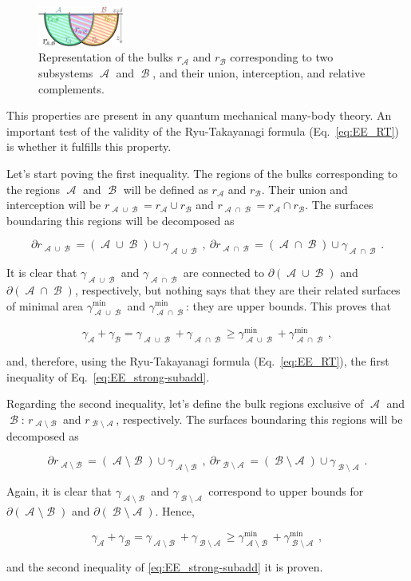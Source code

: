 \documentclass[twocolumn]{revtex4}
\providecommand{\eq}[2]{
    \begin{equation}
        #2
    \label{eq:#1}
    \end{equation}
}
\DeclareMathOperator{\calA}{\mathcal{A}}
\DeclareMathOperator{\calB}{\mathcal{B}}
\begin{document}
\begin{figure}
    \centering
    \includegraphics[width=0.25\textwidth]{../Imatges/SS_D.png}
\caption{Representation of the bulks $r_{\calA}$ and $r_{\calB}$ corresponding to two subsystems $\calA$ and $\calB$, and their union, interception, and relative complements.}
\label{fig:SS}
\end{figure}

This properties are present in any quantum mechanical many-body theory. An important test of the validity of the Ryu-Takayanagi formula (Eq.~\ref{eq:EE_RT}) is whether it fulfills this property.

Let's start poving the first inequality. The regions of the bulks corresponding to the regions $\calA$ and $\calB$ will be defined as $r_{\calA}$ and $r_{\calB}$. Their union and interception will be $r_{\calA \cup \calB} = r_{\calA} \cup r_{\calB}$ and $r_{\calA \cap \calB} = r_{\calA} \cap r_{\calB}$. The surfaces boundaring this regions will be decomposed as
\eq{SS_dr-1}{
    \partial r_{\calA \cup \calB} = (\calA \cup \calB) \cup \gamma_{\calA \cup \calB} \ , \ \partial r_{\calA \cap \calB } = (\calA \cap \calB) \cup \gamma_{\calA \cap \calB} \ .
}
It is clear that $\gamma_{\calA \cup \calB}$ and $\gamma_{\calA \cap \calB}$ are connected to $\partial (\calA \cup \calB)$ and $\partial (\calA \cap \calB)$, respectively, but nothing says that they are their related surfaces of minimal area $\gamma^{\text{min}}_{\calA \cup \calB}$ and $\gamma^{\text{min}}_{\calA \cap \calB}$: they are upper bounds. This proves that
\eq{SS_gamma-1}{
    \gamma_{\calA} + \gamma_{\calB} = \gamma_{\calA \cup \calB} + \gamma_{\calA \cap \calB} \ge \gamma^{\text{min}}_{\calA \cup \calB} + \gamma^{\text{min}}_{\calA \cap \calB} \ ,
}
and, therefore, using the Ryu-Takayanagi formula (Eq.~\ref{eq:EE_RT}), the first inequality of Eq.~\ref{eq:EE_strong-subadd}.

Regarding the second inequality, let's define the bulk regions exclusive of $\calA$ and $\calB$: $r_{\calA \setminus \calB}$ and $r_{\calB \setminus \calA}$, respectively. The surfaces boundaring this regions will be decomposed as
\eq{SS_dr-2}{
    \partial r_{\calA \setminus \calB} = (\calA \setminus \calB) \cup \gamma_{\calA \setminus \calB} \ , \ \partial r_{\calB \setminus \calA } = (\calB \setminus \calA) \cup \gamma_{\calB \setminus \calA} \ .
}
Again, it is clear that $\gamma_{\calA \setminus \calB}$ and $\gamma_{\calB \setminus \calA}$ correspond to upper bounds for $\partial (\calA \setminus \calB)$ and $\partial (\calB \setminus \calA)$. Hence,
\eq{SS_gamma-2}{
    \gamma_{\calA} + \gamma_{\calB} = \gamma_{\calA \setminus \calB} + \gamma_{\calB \setminus \calA} \ge \gamma^{\text{min}}_{\calA \setminus \calB} + \gamma^{\text{min}}_{\calB \setminus \calA} \ ,
}
and the second inequality of \ref{eq:EE_strong-subadd} it is proven.
\end{document}
